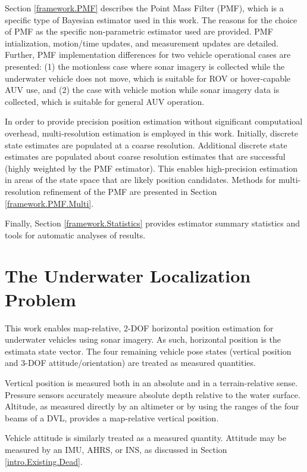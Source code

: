 Section \ref{framework.PMF} describes the Point Mass Filter (PMF), which is a specific type of Bayesian estimator used in this work. 
The reasons for the choice of PMF as the specific non-parametric estimator used are provided.
PMF intialization, motion/time updates, and measurement updates are detailed.
Further, PMF implementation differences for two vehicle operational cases are presented: (1) the motionless case where sonar imagery is collected while the underwater vehicle does not move, which is suitable for ROV or hover-capable AUV use, and (2) the case with vehicle motion while sonar imagery data is collected, which is suitable for general AUV operation.

In order to provide precision position estimation without significant computatioal overhead, multi-resolution estimation is employed in this work.
Initially, discrete state estimates are populated at a coarse resolution.
Additional discrete state estimates are populated about coarse resolution estimates that are successful (highly weighted by the PMF estimator).
This enables high-precision estimation in areas of the state space that are likely position candidates.
Methods for multi-resolution refinement of the PMF are presented in Section \ref{framework.PMF.Multi}.

Finally, Section \ref{framework.Statistics} provides estimator summary statistics and tools for automatic analyses of results.  

\section{The Underwater Localization Problem}
\label{framework.Underwater}

This work enables map-relative, 2-DOF horizontal position estimation for underwater vehicles using sonar imagery.  As such, horizontal position is the estimata state vector.  The four remaining vehicle pose states (vertical position and 3-DOF attitude/orientation) are treated as measured quantities.

Vertical position is measured both in an absolute and in a terrain-relative sense.
Pressure sensors accurately measure absolute depth relative to the water surface.
Altitude, as measured directly by an altimeter or by using the ranges of the four beams of a DVL, provides a map-relative vertical position.

Vehicle attitude is similarly treated as a measured quantity.
Attitude may be measured by an IMU, AHRS, or INS, as discussed in Section \ref{intro.Existing.Dead}.

